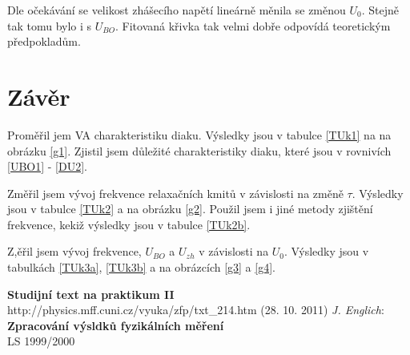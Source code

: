 \documentclass[a4paper,12pt]{article}
\begin{document}
    Dle očekávání se velikost zhášecího napětí lineárně měnila se změnou $U_0$. Stejně tak tomu bylo i s $U_{BO}$. 
    Fitovaná křivka tak velmi dobře odpovídá teoretickým předpokladům.

\section{Závěr}
    Proměřil jem VA charakteristiku diaku. Výsledky jsou v tabulce \ref{TUk1} na na obrázku \ref{g1}. Zjistil jsem důležité 
    charakteristiky diaku, které jsou v rovnivích \ref{UBO1} - \ref{DU2}.

    Změřil jsem vývoj frekvence relaxačních kmitů v závislosti na změně $\tau$. Výsledky jsou v tabulce \ref{TUk2} a na obrázku \ref{g2}. 
    Použil jsem i jiné metody zjištění frekvence, kekiž výsledky jsou v tabulce \ref{TUk2b}.

    Z,ěřil jsem vývoj frekvence, $U_{BO}$ a $U_{zh}$ v závislosti na $U_0$. Výsledky jsou v tabulkách \ref{TUk3a}, \ref{TUk3b} a na obrázcích \ref{g3} a \ref{g4}. 

\begin{thebibliography}{5}
	 \textbf{Studijní text na praktikum II} \\http://physics.mff.cuni.cz/vyuka/zfp/txt\_214.htm (28. 10. 2011)
     \emph{J. Englich}: \textbf{Zpracování výsldků fyzikálních měření} \\ LS 1999/2000
\end{thebibliography}
\end{document}
